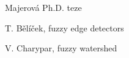 \begin{thebibliography}{9}
        Majerová Ph.D. teze

        T. Bělíček, fuzzy edge detectors

        V. Charypar, fuzzy watershed

\end{thebibliography} 